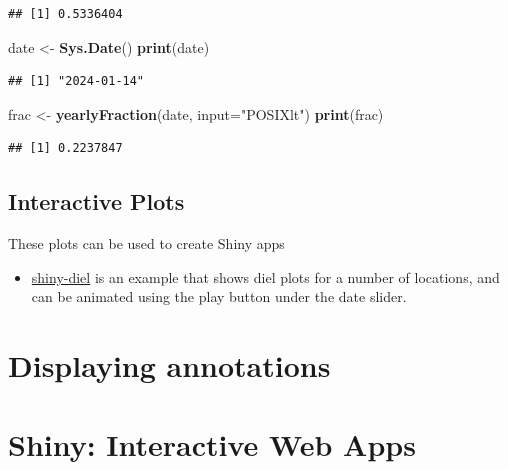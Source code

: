 \documentclass[
]{book}
\newenvironment{Shaded}{\begin{snugshade}}{\end{snugshade}}
\newcommand{\AttributeTok}[1]{\textcolor[rgb]{0.13,0.29,0.53}{#1}}
\newcommand{\FunctionTok}[1]{\textcolor[rgb]{0.13,0.29,0.53}{\textbf{#1}}}
\newcommand{\NormalTok}[1]{#1}
\newcommand{\OtherTok}[1]{\textcolor[rgb]{0.56,0.35,0.01}{#1}}
\newcommand{\StringTok}[1]{\textcolor[rgb]{0.31,0.60,0.02}{#1}}
\providecommand{\tightlist}{%
  \setlength{\itemsep}{0pt}\setlength{\parskip}{0pt}}
\begin{document}
\begin{verbatim}
## [1] 0.5336404
\end{verbatim}

\begin{Shaded}
\begin{Highlighting}[]
\NormalTok{date }\OtherTok{\textless{}{-}} \FunctionTok{Sys.Date}\NormalTok{()}
\FunctionTok{print}\NormalTok{(date)}
\end{Highlighting}
\end{Shaded}

\begin{verbatim}
## [1] "2024-01-14"
\end{verbatim}

\begin{Shaded}
\begin{Highlighting}[]
\NormalTok{frac }\OtherTok{\textless{}{-}} \FunctionTok{yearlyFraction}\NormalTok{(date, }\AttributeTok{input=}\StringTok{"POSIXlt"}\NormalTok{)}
\FunctionTok{print}\NormalTok{(frac)}
\end{Highlighting}
\end{Shaded}

\begin{verbatim}
## [1] 0.2237847
\end{verbatim}

\hypertarget{interactive-plots}{%
\section{Interactive Plots}\label{interactive-plots}}

These plots can be used to create Shiny apps

\begin{itemize}
\tightlist
\item
  \href{https://shiny.ebaker.me.uk/shiny-diel/}{shiny-diel} is an example that shows diel plots for a number of locations, and can be animated using the play button under the date slider.
\end{itemize}

\hypertarget{displaying-annotations}{%
\chapter{Displaying annotations}\label{displaying-annotations}}

\hypertarget{shiny-interactive-web-apps}{%
\chapter{Shiny: Interactive Web Apps}\label{shiny-interactive-web-apps}}
\end{document}
